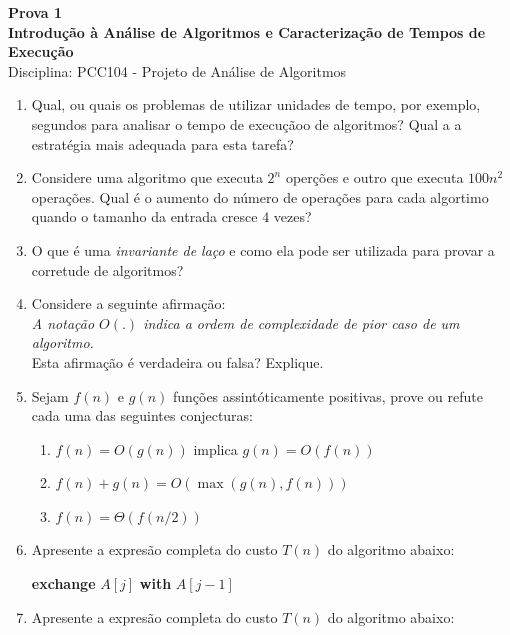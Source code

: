 \documentclass[9pt,a4paper]{extarticle}
\begin{document}
\begin{center}
  \Large \textbf{Prova 1 \\ Introdução à Análise de Algoritmos e Caracterização de Tempos de Execução} \\[4pt]
  \normalsize Disciplina: PCC104 - Projeto de Análise de Algoritmos
\end{center}

\vspace{1cm}

\begin{enumerate}
  \item Qual, ou quais os problemas de utilizar unidades de tempo, por exemplo, segundos para analisar o tempo de execuçãoo de algoritmos? Qual a a estratégia mais adequada para esta tarefa?
  \item Considere uma algoritmo que executa $2^n$ operções e outro que executa $100n^2$ operações. Qual é o aumento do número de operações para cada algortimo quando o tamanho da entrada cresce $4$ vezes?
  \item O que é uma \textit{invariante de laço} e como ela pode ser utilizada para provar a corretude de algoritmos?
  \item Considere a seguinte afirmação: \\
  \textit{A notação $O(.)$ indica a ordem de complexidade de pior caso de um algoritmo.}\\
  Esta afirmação é verdadeira ou falsa? Explique.
  \item Sejam $f(n)$ e $g(n)$ funções assintóticamente positivas, prove ou refute cada uma das seguintes conjecturas:
  \begin{enumerate}
    \item $f(n) = O(g(n))$ implica $g(n) = O(f(n))$
    \item $f(n) + g(n) = O(\max(g(n),f(n)))$
    \item $f(n) = \Theta(f(n/2))$
  \end{enumerate}
  \item Apresente a expresão completa do custo $T(n)$ do algoritmo abaixo:
    \begin{algorithmic}[1]
                \State \textbf{exchange} $A[j]$ \textbf{with} $A[j-1]$
            \EndIf
        \EndFor
    \EndFor
  \end{algorithmic}
  \item Apresente a expresão completa do custo $T(n)$ do algoritmo abaixo:

\end{enumerate}
\end{document}
